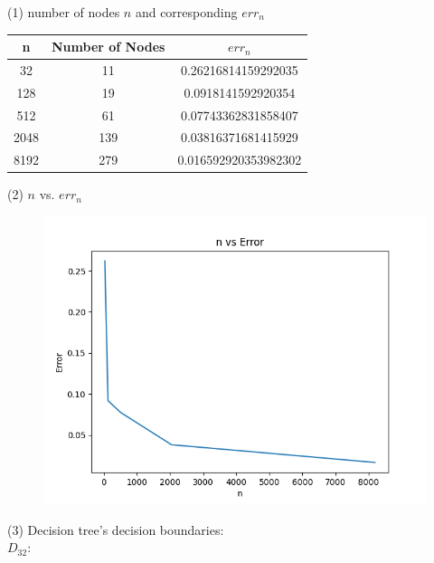\documentclass[a4paper]{article}
\theoremstyle{definition}
\newenvironment{soln}{
    \leavevmode\color{blue}\ignorespaces
}{}
\begin{document}
\begin{enumerate}
  \begin{soln}
    (1) number of nodes $n$ and corresponding $err_n$ \\
    \begin{center}
    \begin{tabular}{ |c| c| c| }
        \hline n & Number of Nodes & $err_n$ \\
        \hline 32 & 11 & 0.26216814159292035 \\
        \hline 128 & 19 & 0.0918141592920354 \\
        \hline 512 & 61 & 0.07743362831858407 \\
        \hline 2048 & 139 & 0.03816371681415929 \\
        \hline 8192 & 279 & 0.016592920353982302 \\
        \hline
    \end{tabular}
    \end{center}
    (2) $n$ vs. $err_n$ \\
    \begin{figure}[h!]
        \centering
        \includegraphics[width=1\textwidth]{images/nvserr.png}  
        \captionsetup{labelformat=empty}
        \caption{}
        \label{fig:mixed}
    \end{figure}
    \newpage
    (3) Decision tree's decision boundaries: \\
    $D_{32}$:
    \begin{figure}[h!]
        \centering

\end{figure}
\end{soln}
\end{enumerate}
\end{document}

